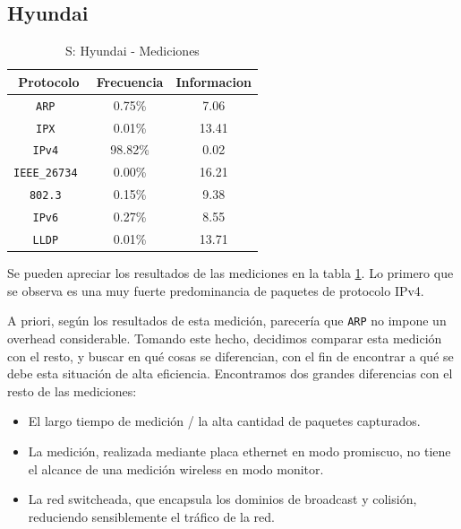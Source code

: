 \documentclass[final,inline,a4paper,narroweqnarray]{ieee}
\let\Oldsubsection\subsection
\renewcommand{\subsection}{\FloatBarrier\Oldsubsection}
\begin{document}
  \FloatBarrier
  \subsection{Hyundai}

    \begin{table}[ht]\begin{center}
      \begin{tabular}{|c|c|c|}
      \hline
      \textbf{Protocolo}   & \textbf{Frecuencia} & \textbf{Informacion}\\ \hline
      \texttt{ARP         }& 0.75\%     & 7.06       \\ \hline
      \texttt{IPX         }& 0.01\%     & 13.41      \\ \hline
      \texttt{IPv4        }& 98.82\%    & 0.02       \\ \hline
      \texttt{IEEE\_26734 }& 0.00\%     & 16.21      \\ \hline
      \texttt{802.3       }& 0.15\%     & 9.38       \\ \hline
      \texttt{IPv6        }& 0.27\%     & 8.55       \\ \hline
      \texttt{LLDP        }& 0.01\%     & 13.71      \\ \hline
      \end{tabular}
      \caption{S: Hyundai - Mediciones}
      \label{hyundai-s-table}
    \end{center}\end{table}

    Se pueden apreciar los resultados de las mediciones en la tabla
    \ref{hyundai-s-table}. Lo primero que se observa es una muy fuerte
    predominancia de paquetes de protocolo IPv4.

    A priori, según los resultados de esta medición, parecería que
    \texttt{ARP} no impone un overhead considerable. Tomando este
    hecho, decidimos comparar esta medición con el resto, y buscar en
    qué cosas se diferencian, con el fin de encontrar a qué se debe
    esta situación de alta eficiencia. Encontramos dos grandes
    diferencias con el resto de las mediciones:

    \begin{itemize}

    \item El largo tiempo de medición / la alta cantidad de paquetes
    capturados.

    \item La medición, realizada mediante placa ethernet en modo
    promiscuo, no tiene el alcance de una medición wireless en modo
    monitor.

    \item La red switcheada, que encapsula los dominios de broadcast y
    colisión, reduciendo sensiblemente el tráfico de la red.

    \end{itemize}
\end{document}

